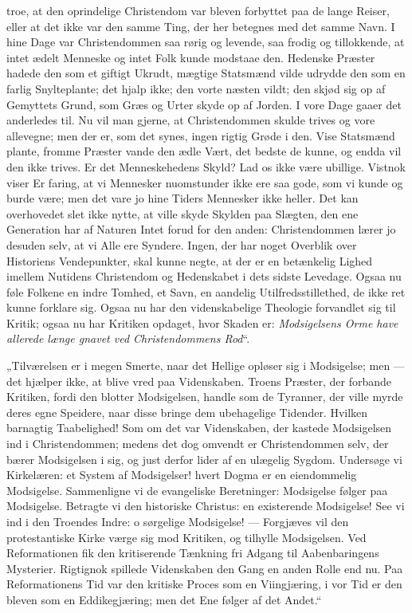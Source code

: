 \documentclass[12pt,a4paper]{book}
\begin{document}
troe, at den oprindelige Christendom var bleven forbyttet paa de lange Reiser,
eller at det ikke var den samme Ting, der her betegnes med det samme Navn. I hine
Dage var Christendommen saa rørig og levende, saa frodig og tillokkende, at intet
ædelt Menneske og intet Folk kunde modstaae den. Hedenske Præster hadede den som
et giftigt Ukrudt, mægtige Statsmænd vilde udrydde den som en farlig
Snylteplante; det hjalp ikke; den
vorte næsten vildt; den skjød sig op af Gemyttets Grund, som Græs og Urter skyde
op af Jorden. I vore Dage gaaer det anderledes til. Nu vil man gjerne, at
Christendommen skulde trives og
vore allevegne; men der er, som det synes, ingen rigtig Grøde i den. Vise
Statsmænd plante, fromme Præster vande den ædle
Vært, det bedste de kunne, og endda vil den ikke trives. Er det Menneskehedens
Skyld? Lad os ikke være ubillige. Vistnok viser Er\-%
faring, at vi Mennesker nuomstunder ikke ere saa gode, som vi kunde og burde
være; men det vare jo hine Tiders Mennesker ikke heller. Det kan overhovedet slet
ikke nytte, at ville skyde Skylden paa Slægten, den ene Generation har af Naturen
Intet forud for den anden: Christendommen lærer jo desuden selv, at vi Alle ere
Syndere. Ingen, der har noget Overblik over Historiens Vendepunkter, skal kunne
negte, at der er en betænkelig Lighed imellem Nutidens Christendom og
Hedenskabet i dets sidste Levedage. Ogsaa nu føle Folkene en indre Tomhed, et
Savn, en aandelig Utilfredsstillethed, de ikke ret kunne forklare sig. Ogsaa nu
har den videnskabelige Theologie forvandlet sig til Kritik; ogsaa nu har Kritiken
opdaget, hvor Skaden er: \emph{Modsigelsens Orme have allerede længe gnavet ved
Christendommens Rod}“.

„Tilværelsen er i megen Smerte, naar det Hellige opløser sig i Modsigelse; men
--- det hjælper ikke, at blive vred paa Videnskaben. Troens Præster, der forbande
Kritiken, fordi den blotter Modsigelsen, handle som de Tyranner, der ville myrde
deres egne Speidere, naar disse bringe dem ubehagelige Tidender. Hvilken
barnagtig Taabelighed! Som om det var Videnskaben, der kastede Modsigelsen ind i
Christendommen; medens det dog omvendt er Christendommen selv, der bærer
Modsigelsen i sig, og just derfor lider af en ulægelig Sygdom. Undersøge vi
Kirkelæren: et System af Modsigelser! hvert Dogma er en eiendommelig Modsigelse.
Sammenligne vi de evangeliske Beretninger: Modsigelse følger paa Modsigelse.
Betragte vi den historiske Christus: en existerende Modsigelse! See vi ind i den
Troendes Indre: o sørgelige Modsigelse! --- Forgjæves vil den protestantiske
Kirke værge sig mod Kritiken, og tilhylle Modsigelsen. Ved Reformationen fik den
kritiserende Tænkning fri Adgang til Aabenbaringens Mysterier. Rigtignok spillede
Videnskaben den
Gang en anden Rolle end nu. Paa Reformationens Tid var den kritiske Proces som en
Viingjæring, i vor Tid er den bleven som en Eddikegjæring; men det Ene følger af
det Andet.“
\end{document}
